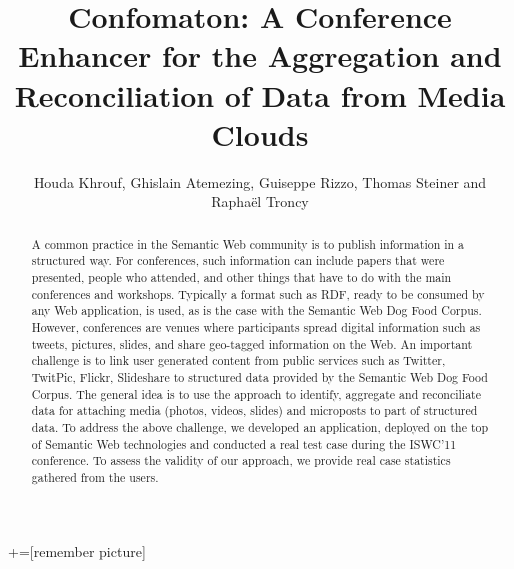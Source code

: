 \documentclass{llncs}
\begin{document}
+=[remember picture]

\mainmatter



\title{Confomaton: A Conference Enhancer for the Aggregation and Reconciliation of Data from Media Clouds}

\author{Houda Khrouf, Ghislain Atemezing, Guiseppe Rizzo, Thomas Steiner and Raphaël Troncy}


\maketitle

\renewcommand{\ttdefault}{pcr}
\renewcommand\UrlFont{\smaller\tt}



\begin{abstract}
  A common practice in the Semantic Web community is to publish information in a structured way.
  For conferences, such information can include papers that were presented, people who attended, and other things that have to do with the main conferences and workshops.
  Typically a format such as RDF, ready to be consumed by any Web application, is used, as is the case with the Semantic Web Dog Food Corpus.
  However, conferences are venues where participants spread digital information such as tweets, pictures, slides, and share geo-tagged information on the Web.
  An important challenge is to link user generated content from public services such as Twitter, TwitPic, Flickr, Slideshare to structured data provided by the Semantic Web Dog Food Corpus.
  The general idea is to use the approach to identify, aggregate and reconciliate data for attaching media (photos, videos, slides) and microposts to part of structured data.
  To address the above challenge, we developed an application, deployed on the top of Semantic Web technologies and conducted a real test case during the ISWC'11 conference.
  To assess the validity of our approach, we provide real case statistics gathered from the users.
\end{abstract}
\end{document}

